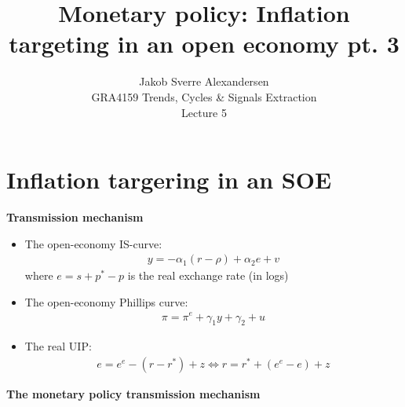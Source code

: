 \documentclass[10pt]{article}
\begin{document}
 
\title{Monetary policy: Inflation targeting in an open economy pt. 3}
\author{Jakob Sverre Alexandersen\\
GRA4159 Trends, Cycles \& Signals Extraction\\
Lecture 5}
\maketitle

\tableofcontents
\newpage
\section{Inflation targering in an SOE}
\textbf{Transmission mechanism}
\begin{itemize}
    \item The open-economy IS-curve: 
    \begin{gather*}
        y = - \alpha_1(r - \rho) + \alpha_2e + v
    \end{gather*}
    where $e = s + p^* - p $ is the real exchange rate (in logs)
    \item The open-economy Phillips curve: 
    \begin{gather*}
        \pi = \pi^e + \gamma_1y + \gamma_2 + u
    \end{gather*}
    \item The real UIP:
    \begin{gather*}
        e = e^e - (r - r^*) + z \iff r = r^* + (e^e - e) + z
    \end{gather*}
\end{itemize}

\textbf{The monetary policy transmission mechanism}
\end{document}
